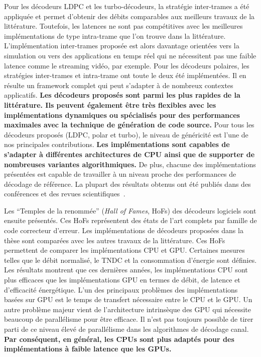 Pour les décodeurs LDPC et les turbo-décodeurs, la stratégie inter-trames a été
appliquée et permet d'obtenir des débits comparables aux meilleurs travaux de la
littérature. Toutefois, les latences ne sont pas compétitives avec les
meilleures implémentations de type intra-trame que l'on trouve dans la
littérature. L'implémentation inter-trames proposée est alors davantage
orientées vers la simulation ou vers des applications en temps réel qui ne
nécessitent pas une faible latence comme le streaming vidéo, par exemple. Pour
les décodeurs polaires, les stratégies inter-trames et intra-trame ont toute le
deux été implémentées. Il en résulte un framework complet qui peut s'adapter à
de nombreux contextes applicatifs. \textbf{Les décodeurs proposés sont parmi les
plus rapides de la littérature. Ils peuvent également être très flexibles avec
les implémentations dynamiques ou spécialisés pour des performances maximales
avec la technique de génération de code source.} Pour tous les décodeurs
proposés (LDPC, polar et turbo), le niveau de généricité est l'une de nos
principales contributions. \textbf{Les implémentations sont capables de
s'adapter à différentes architectures de CPU ainsi que de supporter de
nombreuses variantes algorithmiques.} De plus, chacune des implémentations
présentées est capable de travailler à un niveau proche des performances de
décodage de référence. La plupart des résultats obtenus ont été publiés dans des
conférences et des revues scientifiques~\cite{Ghaffari2019,Leonardon2019,
Cassagne2015c,Cassagne2016b,Cassagne2016a}.

Les ``Temples de la renommée'' (\emph{Hall of Fames}, HoFs) des décodeurs
logiciels sont ensuite présentés. Ces HoFs représentent des états de l'art
complets par famille de code correcteur d'erreur. Les implémentations de
décodeurs proposées dans la thèse sont comparées avec les autres travaux de la
littérature. Ces HoFs permettent de comparer les implémentations CPU et GPU.
Certaines mesures telles que le débit normalisé, le TNDC et la consommation
d'énergie sont définies. Les résultats montrent que ces dernières années, les
implémentations CPU sont plus efficaces que les implémentations GPU en termes de
débit, de latence et d'efficacité énergétique. L'un des principaux problèmes des
implémentations basées sur GPU est le temps de transfert nécessaire entre le
CPU et le GPU. Un autre problème majeur vient de l'architecture intrinsèque des
GPU qui nécessite beaucoup de parallélisme pour être efficace. Il n'est pas
toujours possible de tirer parti de ce niveau élevé de parallélisme dans les
algorithmes de décodage canal. \textbf{Par conséquent, en général, les CPUs sont
plus adaptés pour des implémentations à faible latence que les GPUs.}

